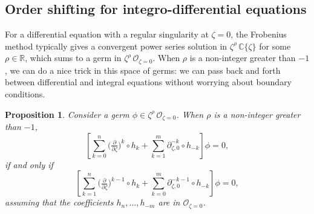 \documentclass{article}
\newcommand{\Z}{\mathbb{Z}}
\newcommand{\R}{\mathbb{R}}
\newcommand{\C}{\mathbb{C}}
\newcommand{\fracderiv}[3]{\partial^{#1}_{#2, #3}}
\theoremstyle{definition}
\theoremstyle{plain}
\newtheorem{prop}[definition]{Proposition}
\begin{document}
\subsection{Order shifting for integro-differential equations}\label{shifting}
For a differential equation with a regular singularity at $\zeta = 0$, the Frobenius method typically gives a convergent power series solution in $\zeta^\rho\,\C\{\zeta\}$ for some $\rho \in \R$, which sums to a germ in $\zeta^\rho\,\mathcal{O}_{\zeta=0}$. When $\rho$ is a non-integer greater than $-1$, we can do a nice trick in this space of germs: we can pass back and forth between differential and integral equations without worrying about boundary conditions.
%
%
\begin{prop}\label{prop:shifting}
Consider a germ $\phi \in \zeta^\rho\,\mathcal{O}_{\zeta=0}$. When $\rho$ is a non-integer greater than $-1$,
\[ \left[ \sum_{k = 0}^n \big(\tfrac{\partial}{\partial \zeta}\big)^k \circ h_k + \sum_{k = 1}^m \fracderiv{-k}{\zeta}{0} \circ h_{-k} \right] \phi = 0, \]
if and only if
\[ \left[ \sum_{k = 1}^n \big(\tfrac{\partial}{\partial \zeta}\big)^{k-1} \circ h_k + \sum_{k = 0}^m \fracderiv{-k-1}{\zeta}{0} \circ h_{-k} \right] \phi = 0, \]
assuming that the coefficients $h_n, \ldots, h_{-m}$ are in $\mathcal{O}_{\zeta=0}$.
\end{prop}
\end{document}
